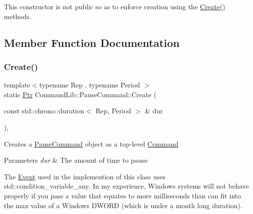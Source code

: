 This constructor is not public so as to enforce creation using the \mbox{\hyperlink{class_command_lib_1_1_pause_command_acf08990d56d99bcec76588d786c980e7}{Create()}} methods. 



\subsection{Member Function Documentation}
\mbox{\label{class_command_lib_1_1_pause_command_acf08990d56d99bcec76588d786c980e7}} 
\subsubsection{\texorpdfstring{Create()}{Create()}\hspace{0.1cm}{\footnotesize\ttfamily [1/4]}}
{\footnotesize\ttfamily template$<$typename Rep , typename Period $>$ \\
static \mbox{\hyperlink{class_command_lib_1_1_command_a3b3e4f00144373299df5c6bb1acc319d}{Ptr}} Command\+Lib\+::\+Pause\+Command\+::\+Create (\begin{DoxyParamCaption}\item[{const std\+::chrono\+::duration$<$ Rep, Period $>$ \&}]{dur }\end{DoxyParamCaption})\hspace{0.3cm}{\ttfamily [inline]}, {\ttfamily [static]}}



Creates a \mbox{\hyperlink{class_command_lib_1_1_pause_command}{Pause\+Command}} object as a top-\/level \mbox{\hyperlink{class_command_lib_1_1_command}{Command}}


\begin{DoxyParams}{Parameters}
{\em dur} & The amount of time to pause\\
\hline
\end{DoxyParams}


The \mbox{\hyperlink{class_command_lib_1_1_event}{Event}} used in the implemention of this class uses std\+::condition\+\_\+variable\+\_\+any. In my experience, Windows systems will not behave properly if you pass a value that equates to more milliseconds than can fit into the max value of a Windows D\+W\+O\+RD (which is under a month long duration). \mbox{\label{class_command_lib_1_1_pause_command_a8c0effc409aae3b87b2126261599f77b}} 
